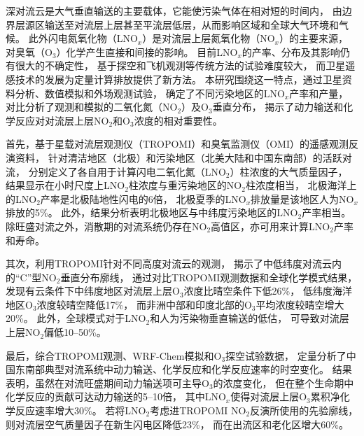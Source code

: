
\abstract
{
深对流云是大气垂直输送的主要载体，它能使污染气体在相对短的时间内，
由边界层源区输送至对流层上层甚至平流层低层，从而影响区域和全球大气环境和气候。
此外闪电氮氧化物（LNO$_x$）是对流层上层氮氧化物（NO$_x$）的主要来源，
对臭氧（O$_3$）化学产生直接和间接的影响。
目前LNO$_x$的产率、分布及其影响仍有很大的不确定性，
基于探空和飞机观测等传统方法的试验难度较大，
而卫星遥感技术的发展为定量计算排放提供了新方法。
本研究围绕这一特点，通过卫星资料分析、数值模拟和外场观测试验，
确定了不同污染地区的LNO$_x$产率和产量，
对比分析了观测和模拟的二氧化氮（NO$_2$）及O$_3$垂直分布，
揭示了动力输送和化学反应对对流层上层NO$_2$和O$_3$浓度的相对重要性。

首先，基于星载对流层观测仪（TROPOMI）和臭氧监测仪（OMI）的遥感观测反演资料，
针对清洁地区（北极）和污染地区（北美大陆和中国东南部）的活跃对流，
分别定义了各自用于计算闪电二氧化氮（LNO$_2$）柱浓度的大气质量因子，
结果显示在小时尺度上LNO$_2$柱浓度与重污染地区的NO$_2$柱浓度相当，
北极海洋上的LNO$_2$产率是北极陆地性闪电的6倍，
北极夏季的LNO$_x$排放量是该地区人为NO$_x$排放的5\%。
此外，结果分析表明北极地区与中纬度污染地区的LNO$_2$产率相当。
除旺盛对流之外，消散期的对流系统仍存在NO$_2$高值区，亦可用来计算LNO$_2$产率和寿命。

其次，利用TROPOMI针对不同高度对流云的观测，
揭示了中低纬度对流云内的“C”型NO$_2$垂直分布廓线，
通过对比TROPOMI观测数据和全球化学模式结果，
发现有云条件下中纬度地区对流层上层O$_3$浓度比晴空条件下低26\%，
低纬度海洋地区O$_3$浓度较晴空降低17\%，
而非洲中部和印度北部的O$_3$平均浓度较晴空增大20\%。
此外，全球模式对于LNO$_2$和人为污染物垂直输送的低估，
可导致对流层上层NO$_2$偏低10--50\%。

最后，综合TROPOMI观测、WRF-Chem模拟和O$_3$探空试验数据，
定量分析了中国东南部典型对流系统中动力输送、化学反应和化学反应速率的时空变化。
结果表明，虽然在对流旺盛期间动力输送项可主导O$_3$的浓度变化，
但在整个生命期中化学反应的贡献可达动力输送的5--10倍，
其中LNO$_x$使得对流层上层O$_3$累积净化学反应速率增大30\%。
若将LNO$_2$考虑进TROPOMI NO$_2$反演所使用的先验廓线，
则对流层空气质量因子在新生闪电区降低23\%，
而在出流区和老化区增大60\%。
}
